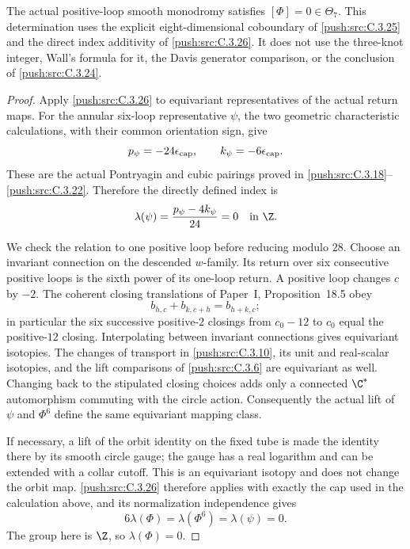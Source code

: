 \begin{corollary}\label{push:src:C.3.27}
The actual positive-loop smooth monodromy satisfies
$[\Phi]=0\in\Theta_7$. This determination uses the explicit
eight-dimensional coboundary of \ref{push:src:C.3.25} and the direct index
additivity of \ref{push:src:C.3.26}. It does not use the three-knot integer,
Wall's formula for it, the Davis generator comparison, or the
conclusion of \ref{push:src:C.3.24}.
\end{corollary}
\begin{proof}
Apply \ref{push:src:C.3.26} to equivariant representatives of the actual return
maps. For the annular six-loop representative $\psi$, the two
geometric characteristic calculations, with their common
orientation sign, give
\[
 p_\psi=-24\epsilon_{\rm cap},\qquad
 k_\psi=-6\epsilon_{\rm cap}.
\]
These are the actual Pontryagin and cubic pairings proved in
\ref{push:src:C.3.18}--\ref{push:src:C.3.22}. Therefore the directly defined index is
\[
 \lambda(\psi)=\frac{p_\psi-4k_\psi}{24}=0
 \quad\hbox{in }\Z.
\]

We check the relation to one positive loop before reducing
modulo $28$. Choose an invariant connection on the descended
$w$-family. Its return over six consecutive positive loops is
the sixth power of its one-loop return. A positive loop changes
$c$ by $-2$. The coherent closing translations of Paper~I, Proposition~18.5 obey
\[
 b_{h,c}+b_{k,c+h}=b_{h+k,c};
\]
in particular the six successive positive-$2$ closings from
$c_0-12$ to $c_0$ equal the positive-$12$ closing. Interpolating
between invariant connections gives equivariant isotopies.
The changes of transport in \ref{push:src:C.3.10}, its unit and real-scalar
isotopies, and the lift comparisons of \ref{push:src:C.3.6} are equivariant
as well. Changing back to the stipulated closing choices
adds only a connected $\C^*$ automorphism commuting with the
circle action. Consequently the actual lift of $\psi$ and
$\Phi^6$ define the same equivariant mapping class.

If necessary, a lift of the orbit identity on the fixed tube
is made the identity there by its smooth circle gauge; the
gauge has a real logarithm and can be extended with a collar
cutoff. This is an equivariant isotopy and does not change the
orbit map. \ref{push:src:C.3.26} therefore applies with exactly the cap used
in the calculation above, and its normalization independence
gives
\[
 6\lambda(\Phi)=\lambda(\Phi^6)=\lambda(\psi)=0.
\]
The group here is $\Z$, so $\lambda(\Phi)=0$.


\end{proof}
